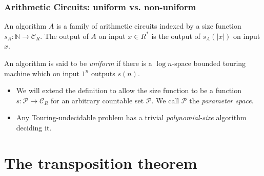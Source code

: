 \documentclass[10pt]{beamer}
\newcommand{\N}{\mathbb{N}}
\begin{document}

\begin{frame}
  \frametitle{Arithmetic Circuits: uniform vs. non-uniform}

  \begin{definition}[Algorithm]
    An algorithm $A$ is a family of arithmetic circuits indexed by a
    size function $s_A:\N\rightarrow\mathcal{C}_R$. The output of $A$
    on input $x\in R^\ast$ is the output of $s_A(|x|)$ on input $x$.
  \end{definition}

  \begin{definition}
    An algorithm is said to be \emph{uniform} if there is a $\log
    n$-space bounded touring machine which on input $1^n$ outputs
    $s(n)$.
  \end{definition}

  \begin{itemize}
  \item We will extend the definition to allow the size function to be
    a function $s:\mathcal{P}\rightarrow\mathcal{C}_R$ for an
    arbitrary countable set $\mathcal{P}$. We call $\mathcal{P}$ the
    \emph{parameter space}.
  \item \alert{Any Touring-undecidable problem has a trivial
      \emph{polynomial-size} algorithm deciding it.}
  \end{itemize}
\end{frame}


\section{The transposition theorem}
\end{document}
